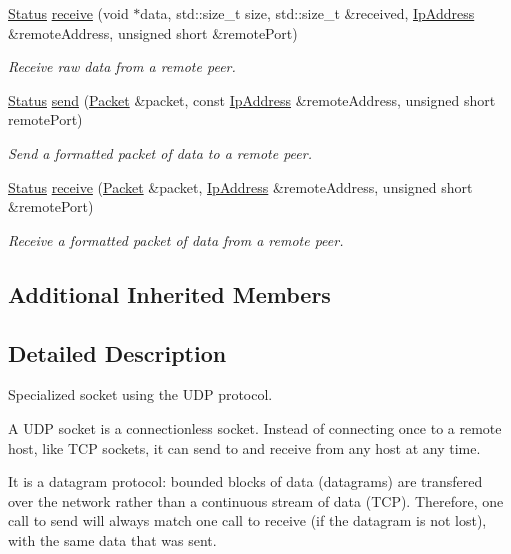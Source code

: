 \begin{DoxyCompactItemize}
\hyperlink{classsf_1_1_socket_a51bf0fd51057b98a10fbb866246176dc}{Status} \hyperlink{classsf_1_1_udp_socket_ade9ca0f7ed7919136917b0b997a9833a}{receive} (void $\ast$data, std\+::size\+\_\+t size, std\+::size\+\_\+t \&received, \hyperlink{classsf_1_1_ip_address}{Ip\+Address} \&remote\+Address, unsigned short \&remote\+Port)
\begin{DoxyCompactList}\small\item\em Receive raw data from a remote peer. \end{DoxyCompactList}\item 
\hyperlink{classsf_1_1_socket_a51bf0fd51057b98a10fbb866246176dc}{Status} \hyperlink{classsf_1_1_udp_socket_a48969a62c80d40fd74293a740798e435}{send} (\hyperlink{classsf_1_1_packet}{Packet} \&packet, const \hyperlink{classsf_1_1_ip_address}{Ip\+Address} \&remote\+Address, unsigned short remote\+Port)
\begin{DoxyCompactList}\small\item\em Send a formatted packet of data to a remote peer. \end{DoxyCompactList}\item 
\hyperlink{classsf_1_1_socket_a51bf0fd51057b98a10fbb866246176dc}{Status} \hyperlink{classsf_1_1_udp_socket_afdd5c655d00c96222d5b477fc057a22b}{receive} (\hyperlink{classsf_1_1_packet}{Packet} \&packet, \hyperlink{classsf_1_1_ip_address}{Ip\+Address} \&remote\+Address, unsigned short \&remote\+Port)
\begin{DoxyCompactList}\small\item\em Receive a formatted packet of data from a remote peer. \end{DoxyCompactList}\end{DoxyCompactItemize}
\subsection*{Additional Inherited Members}


\subsection{Detailed Description}
Specialized socket using the U\+DP protocol. 

A U\+DP socket is a connectionless socket. Instead of connecting once to a remote host, like T\+CP sockets, it can send to and receive from any host at any time.

It is a datagram protocol\+: bounded blocks of data (datagrams) are transfered over the network rather than a continuous stream of data (T\+CP). Therefore, one call to send will always match one call to receive (if the datagram is not lost), with the same data that was sent.

